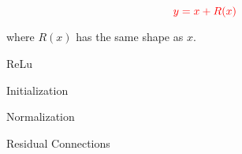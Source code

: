 {

$${\color{red} y = x + R(x)}$$

\vfill
where $R(x)$ has the same shape as $x$.

  \centerline{ReLu}
  \vfill
  \centerline{Initialization}
  \vfill
  \centerline{Normalization}
  \vfill
  \centerline{Residual Connections}


}

